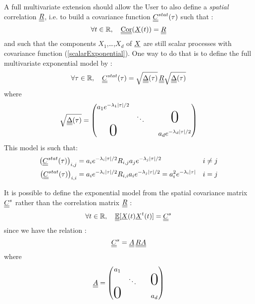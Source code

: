 A full multivariate extension should allow the User to also define a \emph{spatial} correlation ${\underline{\underline{R}}}$, i.e. to build a covariance function ${\underline{\underline{C}}}^{stat}(\tau)$ such that :
\begin{equation}
\label{fullMultivariateExponential1}
\forall t\in\mathbb{R},\quad{\underline{\underline{\text{Cor}}}}({\underline{X}}(t))={\underline{\underline{R}}}
\end{equation}
and such that the components $X_1$,\dots,$X_d$ of ${\underline{X}}$ are still scalar processes with covariance function (\ref{scalarExponential}). One way to do that is to define the full multivariate exponential model by :
\begin{equation}
\label{fullMultivariateExponential2}
\forall \tau\in\mathbb{R},\quad {\underline{\underline{C}}}^{stat}(\tau)=\sqrt{{\underline{\underline{\Delta}}}(\tau)}\,{\underline{\underline{R}}}\sqrt{{\underline{\underline{\Delta}}}(\tau)}
\end{equation}
where
\begin{equation}
\label{fullMultivariateExponential3}
\sqrt{\mat{\Delta}(\tau)}=
\begin{pmatrix}
  a_1e^{-\lambda_1|\tau|/2} & & & \\
                       &\ddots & & \text{\Huge{0}}\\
  \text{\Huge{0}}      & & & a_de^{-\lambda_d|\tau|/2}
\end{pmatrix}
\end{equation}
 This model is such that:
\begin{align}
\left({\underline{\underline{C}}}^{stat}(\tau)\right)_{i,j}&=a_ie^{-\lambda_i|\tau|/2}R_{i,j}a_je^{-\lambda_j|\tau|/2}& i\neq j\\
\left({\underline{\underline{C}}}^{stat}(\tau)\right)_{i,i}&=a_ie^{-\lambda_i|\tau|/2}R_{i,i}a_ie^{-\lambda_j|\tau|/2}=a_i^2e^{-\lambda_i|\tau|}& i=j
\end{align}

It is possible to define the exponential model from the spatial covariance matrix ${\underline{\underline{C}}}^s$ rather than the correlation matrix ${\underline{\underline{R}}}$ : 
\begin{equation}
  \forall t\in\mathbb{R},\quad{\underline{\underline{\mathbb{E}}}}[{\underline{X}}(t){\underline{X}}^t(t)]={\underline{\underline{C}}}^s
\end{equation}
since we have the relation :
\begin{equation}\label{RClink}
{\underline{\underline{C}}}^s={\underline{\underline{A}}}\,{\underline{\underline{R}}}{\underline{\underline{A}}}
\end{equation}
where
\begin{equation}
\mat{A}=
\begin{pmatrix}
  a_1 & & & \\
                       &\ddots & & \text{\Huge{0}}\\
  \text{\Huge{0}}      & & & a_d
\end{pmatrix}
\end{equation}
 
